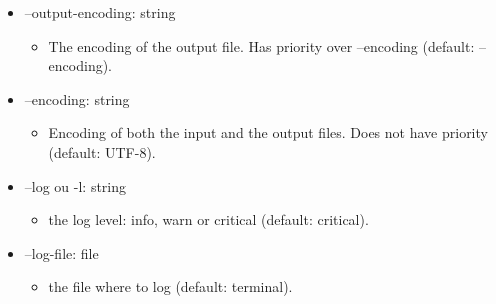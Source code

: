 \documentclass[manual-fr.tex]{subfiles}
\begin{document}
\begin{itemize}
\begin{itemize}
\begin{itemize}
                \end{itemize}
            \item[] --output-encoding: string
                \begin{itemize}
                    \item[] The encoding of the output file. Has priority over --encoding (default: --encoding).
                \end{itemize}
            \item[] --encoding: string
                \begin{itemize}
                    \item[] Encoding of both the input and the output files. Does not have priority (default: UTF-8).
                \end{itemize}
            \item[] --log ou -l: string
                \begin{itemize}
                    \item[] the log level: info, warn or critical (default: critical).
                \end{itemize}
            \item[] --log-file: file
                \begin{itemize}
                    \item[] the file where to log (default: terminal).
                \end{itemize}
        \end{itemize}
\end{itemize}
\end{document}
